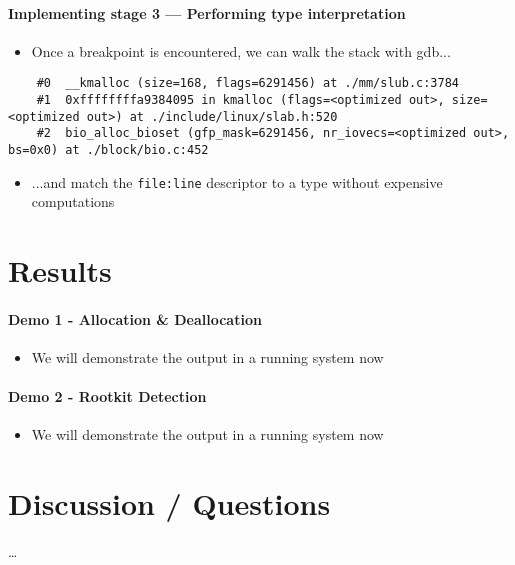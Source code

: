 \documentclass{i20lecture}
\begin{document}
\begin{frame}[fragile]{\insertsection}
  \framesubtitle{Implementing stage 3 --- Performing type interpretation}
    \begin{itemize}
     \item Once a breakpoint is encountered, we can walk the stack with gdb...
    \end{itemize}
\pause
    \begin{lstlisting}
    #0  __kmalloc (size=168, flags=6291456) at ./mm/slub.c:3784
    #1  0xffffffffa9384095 in kmalloc (flags=<optimized out>, size=<optimized out>) at ./include/linux/slab.h:520
    #2  bio_alloc_bioset (gfp_mask=6291456, nr_iovecs=<optimized out>, bs=0x0) at ./block/bio.c:452
    \end{lstlisting}
\pause
    \begin{itemize}
     \item ...and match the \lstinline|file:line| descriptor to a type without expensive computations
    \end{itemize}
\end{frame}

\section{Results}

\begin{frame}[fragile]{\insertsection}
  \framesubtitle{Demo 1 - Allocation \& Deallocation}
    \begin{itemize}
     \item We will demonstrate the output in a running system now
     \end{itemize}
\end{frame}

\begin{frame}[fragile]{\insertsection}
  \framesubtitle{Demo 2 - Rootkit Detection}
    \begin{itemize}
     \item We will demonstrate the output in a running system now
     \end{itemize}
\end{frame}

\section{Discussion / Questions}
\begin{frame}{\insertsection}
  \begin{center}
    \LARGE \dots
  \end{center}
\end{frame}
\end{document}
